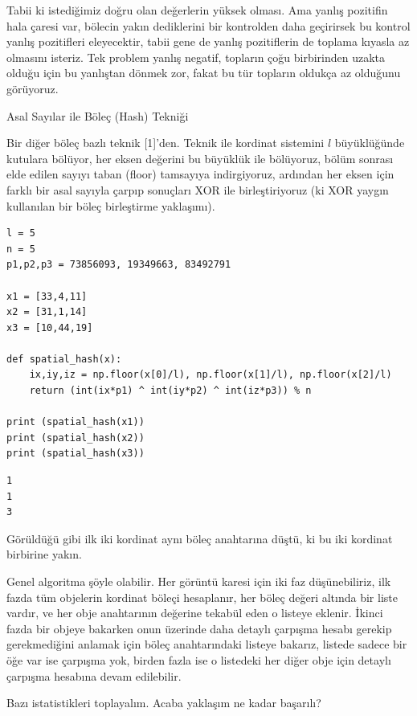 \documentclass[12pt,fleqn]{article}\usepackage{../../common}
\begin{document}
Tabii ki istediğimiz doğru olan değerlerin yüksek olması. Ama yanlış pozitifin
hala çaresi var, bölecin yakın dediklerini bir kontrolden daha geçirirsek bu
kontrol yanlış pozitifleri eleyecektir, tabii gene de yanlış pozitiflerin de
toplama kıyasla az olmasını isteriz. Tek problem yanlış negatif, topların çoğu
birbirinden uzakta olduğu için bu yanlıştan dönmek zor, fakat bu tür topların
oldukça az olduğunu görüyoruz.

Asal Sayılar ile Böleç (Hash) Tekniği

Bir diğer böleç bazlı teknik [1]'den. Teknik ile kordinat sistemini $l$
büyüklüğünde kutulara bölüyor, her eksen değerini bu büyüklük ile bölüyoruz,
bölüm sonrası elde edilen sayıyı taban (floor) tamsayıya indirgiyoruz, ardından
her eksen için farklı bir asal sayıyla çarpıp sonuçları XOR ile birleştiriyoruz
(ki XOR yaygın kullanılan bir böleç birleştirme yaklaşımı).

\begin{verbatim}
l = 5
n = 5
p1,p2,p3 = 73856093, 19349663, 83492791

x1 = [33,4,11]
x2 = [31,1,14]
x3 = [10,44,19]

def spatial_hash(x):
    ix,iy,iz = np.floor(x[0]/l), np.floor(x[1]/l), np.floor(x[2]/l)
    return (int(ix*p1) ^ int(iy*p2) ^ int(iz*p3)) % n

print (spatial_hash(x1))
print (spatial_hash(x2))
print (spatial_hash(x3))
\end{verbatim}

\begin{verbatim}
1
1
3
\end{verbatim}

Görüldüğü gibi ilk iki kordinat aynı böleç anahtarına düştü, ki bu iki kordinat
birbirine yakın.

Genel algoritma şöyle olabilir. Her görüntü karesi için iki faz düşünebiliriz,
ilk fazda tüm objelerin kordinat böleçi hesaplanır, her böleç değeri altında bir
liste vardır, ve her obje anahtarının değerine tekabül eden o listeye
eklenir. İkinci fazda bir objeye bakarken onun üzerinde daha detaylı çarpışma
hesabı gerekip gerekmediğini anlamak için böleç anahtarındaki listeye bakarız,
listede sadece bir öğe var ise çarpışma yok, birden fazla ise o listedeki her
diğer obje için detaylı çarpışma hesabına devam edilebilir.

Bazı istatistikleri toplayalım. Acaba yaklaşım ne kadar başarılı?
\end{document}
